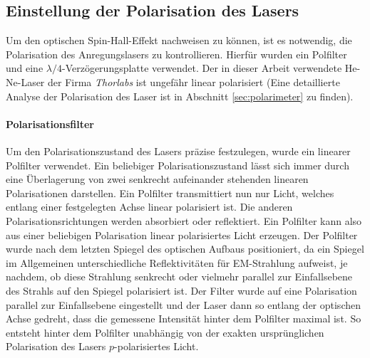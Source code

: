 \documentclass[titlepage,  ngerman]{article}
\begin{document}
	\subsection{Einstellung der Polarisation des Lasers}
	\label{sec:cntr_pol}
	Um den optischen Spin-Hall-Effekt nachweisen zu können, ist es notwendig, die Polarisation des Anregungslasers zu kontrollieren. Hierfür wurden ein Polfilter und eine $\lambda /4$-Verzögerungsplatte verwendet. Der in dieser Arbeit verwendete He-Ne-Laser der Firma \textit{Thorlabs} ist ungefähr linear polarisiert (Eine detaillierte Analyse der Polarisation des Laser ist in Abschnitt \ref{sec:polarimeter} zu finden). 
	\paragraph{Polarisationsfilter}	
	Um den Polarisationszustand des Lasers präzise festzulegen, wurde ein linearer Polfilter verwendet. Ein beliebiger Polarisationszustand lässt sich immer durch eine Überlagerung von zwei senkrecht aufeinander stehenden linearen Polarisationen darstellen. Ein Polfilter transmittiert nun nur Licht, welches entlang einer festgelegten Achse linear polarisiert ist. Die anderen Polarisationsrichtungen werden absorbiert oder reflektiert. Ein Polfilter kann also aus einer beliebigen Polarisation linear polarisiertes Licht erzeugen. Der  Polfilter wurde nach dem letzten Spiegel des optischen Aufbaus positioniert, da ein Spiegel im Allgemeinen unterschiedliche Reflektivitäten für EM-Strahlung aufweist, je nachdem, ob diese Strahlung senkrecht oder vielmehr parallel zur Einfallsebene des Strahls auf den Spiegel polarisiert ist. Der Filter wurde auf eine Polarisation parallel zur Einfallsebene eingestellt und der Laser dann so entlang der optischen Achse gedreht, dass die gemessene Intensität hinter dem Polfilter maximal ist. So entsteht hinter dem Polfilter unabhängig  von der exakten ursprünglichen Polarisation des Lasers $p$-polarisiertes Licht.
\end{document}
